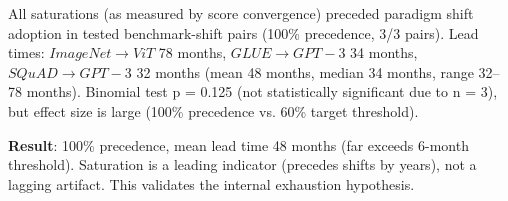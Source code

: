 
All saturations (as measured by score convergence) preceded paradigm shift adoption in tested benchmark-shift pairs (100\% precedence, 3/3 pairs). Lead times: $ImageNet\rightarrow ViT$ 78 months, $GLUE\rightarrow GPT-3$ 34 months, $SQuAD\rightarrow GPT-3$ 32 months (mean 48 months, median 34 months, range 32--78 months). Binomial test p = 0.125 (not statistically significant due to n = 3), but effect size is large (100\% precedence vs. 60\% target threshold).

\begin{table}[htbp]
\centering
{}
\end{table}

\textbf{Result}: 100\% precedence, mean lead time 48 months (far exceeds 6-month threshold). Saturation is a leading indicator (precedes shifts by years), not a lagging artifact. This validates the internal exhaustion hypothesis.
